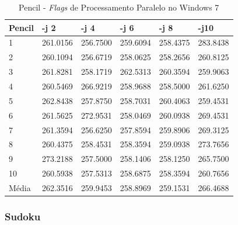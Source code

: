 \begin{apendicesenv}
\begin{table}[!ht]
\centering
\tiny
\caption{Pencil - \textit{Flags} de Processamento Paralelo no Windows 7}
\label{tab:flag_processamento_paralelo:windows:pencil}
\begin{tabular}{llllll}
\textbf{Pencil} & \textbf{-j 2} & \textbf{-j 4} & \textbf{-j 6} & \textbf{-j 8} & \textbf{-j10}  \\ \toprule
1               & 261.0156  &   256.7500 &    259.6094   &  258.4375 &    283.8438           \\ 
2               & 260.1094  &   256.6719 &    258.0625   &  258.2656 &    260.8125           \\ 
3               & 261.8281  &   258.1719 &    262.5313   &  260.3594 &    259.9063           \\ 
4               & 260.5469  &   266.9219 &    258.9688   &  258.5000 &    261.6250           \\ 
5               & 262.8438  &   257.8750 &    258.7031   &  260.4063 &    259.4531           \\ 
6               & 261.5625  &   272.9531 &    258.0469   &  260.0938 &    269.4531           \\ 
7               & 261.3594  &   256.6250 &    257.8594   &  259.8906 &    269.3125           \\ 
8               & 260.4375  &   258.4531 &    258.3594   &  259.0938 &    273.7656           \\ 
9               & 273.2188  &   257.5000 &    258.1406   &  258.1250 &    265.7500           \\ 
10              & 260.5938  &   257.5313 &    258.6875   &  258.3594 &    260.7656           \\ \bottomrule
Média           & 262.3516  &   259.9453 &    258.8969   &  259.1531 &    266.4688           \\ 
\end{tabular}
\end{table}

\clearpage
\subsubsection*{Sudoku}


\end{apendicesenv}
